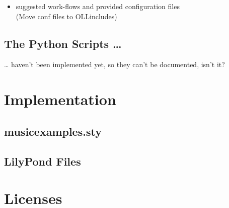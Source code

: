 \documentclass[../openLilyLib]{subfiles}
\begin{document}
\begin{itemize}
\item suggested work-flows and provided configuration files\\
(Move conf files to OLLincludes)
\end{itemize}


\section{The Python Scripts \dots}
\label{sec:xmp_python}
\dots{} haven't been implemented yet, so they can't be documented, isn't it?

\chapter{Implementation}

\section{musicexamples.sty}

\section{LilyPond Files}

\chapter{Licenses}

\end{document}
